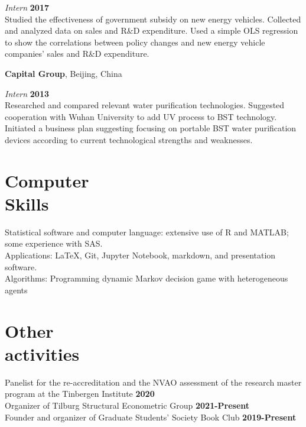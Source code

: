 \documentclass[margin,line]{res}
\newenvironment{list1}{
  \begin{list}{\ding{113}}{%
      \setlength{\itemsep}{0in}
      \setlength{\parsep}{0in} \setlength{\parskip}{0in}
      \setlength{\topsep}{0in} \setlength{\partopsep}{0in} 
      \setlength{\leftmargin}{0.17in}}}{\end{list}}
\begin{document}
\begin{resume}
\vspace{-.3cm}
{\em Intern} \hfill {\bf 2017}\\
Studied the effectiveness of government subsidy on new energy vehicles. Collected and analyzed data on sales and R\&D expenditure. Used a simple OLS regression to show the correlations between policy changes and new energy vehicle companies’ sales and R\&D expenditure.

{\bf Capital Group}, Beijing, China

\vspace{-.3cm}
{\em Intern} \hfill {\bf 2013}\\
Researched and compared relevant water purification technologies. Suggested cooperation with Wuhan University to add UV process to BST technology. Initiated a business plan suggesting focusing on portable BST water purification devices according to current technological strengths and weaknesses.

\section{\sc Computer \\ Skills} 
Statistical software and computer language:  extensive use of R and MATLAB; some experience with SAS.\\
Applications: \LaTeX, Git, Jupyter Notebook, markdown, and presentation software.\\
Algorithms: Programming dynamic Markov decision game with heterogeneous agents

\section{\sc Other \\ activities} 
Panelist for the re-accreditation and the NVAO assessment of the research master program at the Tinbergen Institute \hfill {\bf 2020}\\
Organizer of Tilburg Structural Econometric Group \hfill {\bf 2021-Present}\\
Founder and organizer of Graduate Students' Society Book Club \hfill {\bf 2019-Present}\\


\end{resume}
\end{document}

